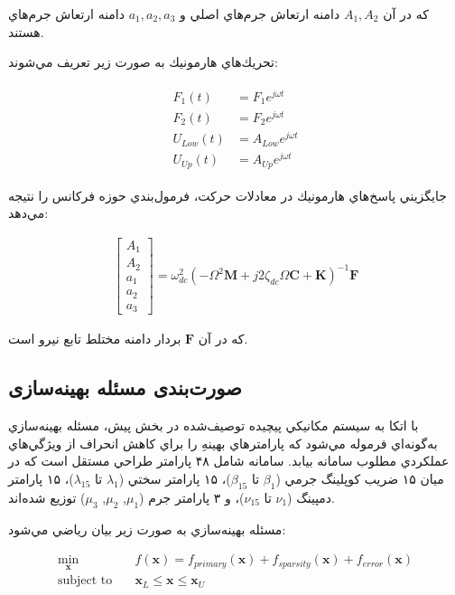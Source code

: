 كه در آن $A_1, A_2$ دامنه ارتعاش جرم‌هاي اصلي و $a_1, a_2, a_3$ دامنه ارتعاش جرم‌هاي  هستند.

تحريك‌هاي هارمونيك به صورت زير تعريف مي‌شوند:

\begin{align}\label{Eq.harmonic.excitations.2dof3dof}
    \begin{split}
        F_1(t) &= F_1 e^{j \omega t} \\
        F_2(t) &= F_2 e^{j \omega t} \\
        U_{Low}(t) &= A_{Low} e^{j \omega t} \\
        U_{Up}(t) &= A_{Up} e^{j \omega t}
    \end{split}
\end{align}

جايگزيني پاسخ‌هاي هارمونيك در معادلات حركت، فرمول‌بندي حوزه فركانس را نتيجه مي‌دهد:

\begin{align}\label{Eq.frequency.domain.2dof3dof}
    \begin{bmatrix}
        A_1 \\
        A_2 \\
        a_1 \\
        a_2 \\
        a_3
    \end{bmatrix} = \omega_{dc}^2 \left( -\Omega^2 \mathbf{M} + j 2 \zeta_{dc} \Omega \mathbf{C} + \mathbf{K} \right)^{-1} \mathbf{F}
\end{align}

كه در آن $\mathbf{F}$ بردار دامنه مختلط تابع نيرو است.


\subsection{صورت‌بندی مسئله بهینه‌سازی}

با اتکا به سيستم مكانيكي پيچيده  توصيف‌شده در بخش پيش، مسئله بهينه‌سازي به‌گونه‌اي فرموله مي‌شود كه پارامترهاي بهينهِ  را براي كاهش انحراف از ويژگي‌هاي عملكردي مطلوب سامانه بيابد. سامانه شامل ۴۸ پارامتر طراحي مستقل است كه در ميان ۱۵ ضريب كوپلينگ جرمي ($\beta_1$ تا $\beta_{15}$)، ۱۵ پارامتر سختي ($\lambda_1$ تا $\lambda_{15}$)، ۱۵ پارامتر دمپينگ ($\nu_1$ تا $\nu_{15}$)، و ۳ پارامتر جرم  ($\mu_1$, $\mu_2$, $\mu_3$) توزيع شده‌اند.

مسئله بهينه‌سازي به صورت زير بيان رياضي مي‌شود:

\begin{equation}\label{Eq.optimization_problem}
\begin{aligned}
\min_{\mathbf{x}} \quad & f(\mathbf{x}) = f_{primary}(\mathbf{x}) + f_{sparsity}(\mathbf{x}) + f_{error}(\mathbf{x}) \\
\text{subject to} \quad & \mathbf{x}_L \leq \mathbf{x} \leq \mathbf{x}_U \\
\end{aligned}
\end{equation}

